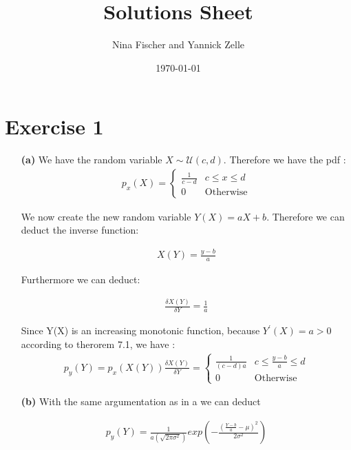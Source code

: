 \documentclass{article}
\title{Solutions Sheet}
\author{Nina Fischer and Yannick Zelle}
\date\today
\begin{document}
\maketitle %




\section*{Exercise 1}
\begin{itemize}
    \item [\textbf{(a)}] We have the random variable $X \sim \mathcal{U}(c,d)$. Therefore we have the pdf :
 \begin{align*}
 p_x(X) =   \begin{cases}
    \frac{1}{c-d} &c \leq x \leq d \\
    0 &\text{Otherwise}
    \end{cases}
\end{align*}

We now create the new random variable $Y(X)=aX+b$. Therefore we can deduct the inverse function:

\begin{align*}
    X(Y) = \frac{y-b}{a}
\end{align*}

Furthermore we can deduct:

\begin{align*}
    \frac{\delta X(Y)}{\delta Y} = \frac{1}{a}
\end{align*}

Since Y(X) is an increasing monotonic function, because $Y^{\prime}(X)=a>0$ according to therorem 7.1, we have :
\begin{align*}
p_y(Y) = p_x(X(Y)) \frac{\delta X(Y)}{\delta Y} = \begin{cases}
    \frac{1}{(c-d)a} &c \leq \frac{y-b}{a} \leq d \\
    0 &\text{Otherwise}
    \end{cases}
\end{align*}

\item[\textbf{(b)}] With the same argumentation as in a we can deduct

\begin{align*}
    p_y(Y)= \frac{1}{a(\sqrt{2\pi \sigma^2})}exp(-\frac{(\frac{Y-b}{a}- \mu)^2}{2 \sigma^2})
\end{align*}  
\end{itemize}
\end{document}
